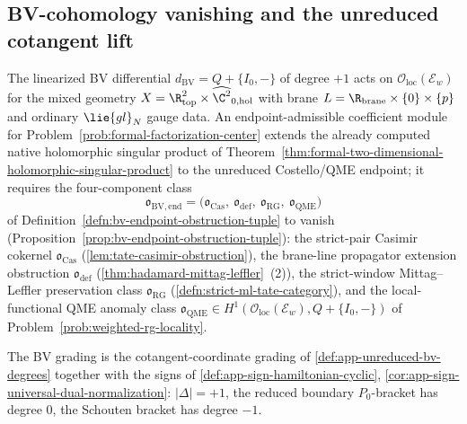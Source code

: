 \subsection*{BV-cohomology vanishing and the unreduced cotangent lift}

The linearized BV differential
\(d_{\mathrm{BV}}=Q+\{I_0,-\}\) of degree \(+1\) acts on
\(\mathcal O_{\mathrm{loc}}(\mathcal E_w)\) for the mixed geometry
\(X=\R^2_{\mathrm{top}}\times\widehat{\C^2}_{0,\mathrm{hol}}\) with
brane \(L=\R_{\mathrm{brane}}\times\{0\}\times\{p\}\) and ordinary
\(\lie{gl}_N\) gauge data.  An endpoint-admissible coefficient module
for Problem~\ref{prob:formal-factorization-center} extends the already
computed native holomorphic singular product of
Theorem~\ref{thm:formal-two-dimensional-holomorphic-singular-product} to the
unreduced Costello/QME endpoint; it requires the four-component class
\[
  \mathfrak o_{\mathrm{BV,end}}
    =\bigl(\mathfrak o_{\mathrm{Cas}},\
            \mathfrak o_{\mathrm{def}},\
            \mathfrak o_{\mathrm{RG}},\
            \mathfrak o_{\mathrm{QME}}\bigr)
\]
of Definition~\ref{defn:bv-endpoint-obstruction-tuple} to vanish
(Proposition~\ref{prop:bv-endpoint-obstruction-tuple}): the
strict-pair Casimir cokernel
\(\mathfrak o_{\mathrm{Cas}}\)
(\ref{lem:tate-casimir-obstruction}), the brane-line propagator
extension obstruction \(\mathfrak o_{\mathrm{def}}\)
(\ref{thm:hadamard-mittag-leffler}~(2)), the strict-window
Mittag--Leffler preservation class \(\mathfrak o_{\mathrm{RG}}\)
(\ref{defn:strict-ml-tate-category}), and the local-functional QME
anomaly class \(\mathfrak o_{\mathrm{QME}}\in
H^1(\mathcal O_{\mathrm{loc}}(\mathcal E_w),Q+\{I_0,-\})\) of
Problem~\ref{prob:weighted-rg-locality}.

The BV grading is the cotangent-coordinate grading of
\ref{def:app-unreduced-bv-degrees} together with the signs of
\ref{def:app-sign-hamiltonian-cyclic},
\ref{cor:app-sign-universal-dual-normalization}: \(|\Delta|=+1\), the
reduced boundary \(P_0\)-bracket has degree \(0\), the Schouten
bracket has degree \(-1\).


